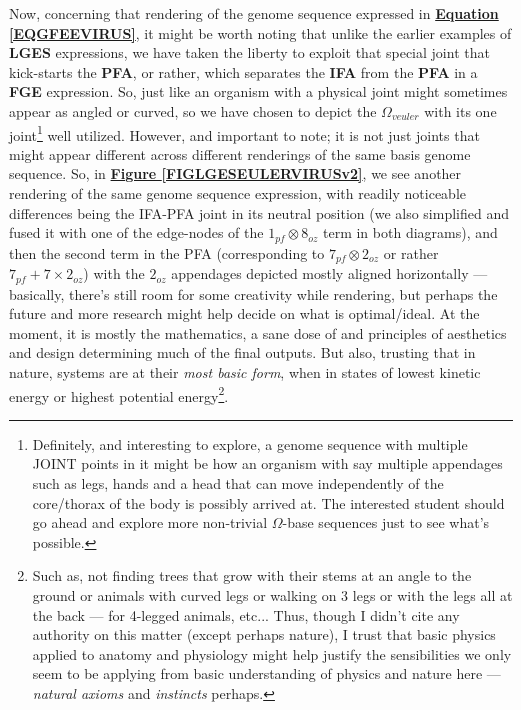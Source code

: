 \documentclass[a4paper, 18pt]{book} %
\begin{document}
Now, concerning that rendering of the genome sequence expressed in \textbf{\hyperref[EQGFEEVIRUS]{Equation \ref{EQGFEEVIRUS}}}, it might be worth noting that unlike the earlier examples of \textbf{LGES} expressions, we have taken the liberty to exploit that special joint that kick-starts the \textbf{PFA}, or rather, which separates the \textbf{IFA} from the \textbf{PFA} in a \textbf{FGE} expression. So, just like an organism with a physical joint might sometimes appear as angled or curved, so we have chosen to depict the $\Omega_{veuler}$ with its one joint\footnote{Definitely, and interesting to explore, a genome sequence with multiple JOINT points in it might be how an organism with say multiple appendages such as legs, hands and a head that can move independently of the core/thorax of the body is possibly arrived at. The interested student should go ahead and explore more non-trivial $\Omega$-base sequences just to see what's possible.} well utilized. However, and important to note; it is not just joints that might appear different across different renderings of the same basis genome sequence. So, in \textbf{\hyperref[FIGLGESEULERVIRUSv2]{Figure \ref{FIGLGESEULERVIRUSv2}}}, we see another rendering of the same genome sequence expression, with readily noticeable differences being the IFA-PFA joint in its neutral position (we also simplified and fused it with one of the edge-nodes of the $1_{pf} \otimes 8_{oz}$ term in both diagrams), and then the second term in the PFA (corresponding to \textbf{$7_{pf} \otimes 2_{oz}$} or rather \textbf{$7_{pf} + 7 \times 2_{oz}$}) with the $2_{oz}$ appendages depicted mostly aligned horizontally --- basically, there's still room for some creativity while rendering, but perhaps the future and more research might help decide on what is optimal/ideal. At the moment, it is mostly the mathematics, a sane dose of and principles of aesthetics and design determining much of the final outputs. But also, trusting that in nature, systems are at their \textit{most basic form}, when in states of lowest kinetic energy or highest potential energy\footnote{Such as, not finding trees that grow with their stems at an angle to the ground or animals with curved legs or walking on 3 legs or with the legs all at the back --- for 4-legged animals, etc... Thus, though I didn't cite any authority on this matter (except perhaps nature), I trust that basic physics applied to anatomy and physiology might help justify the sensibilities we only seem to be applying from basic understanding of physics and nature here --- \textit{natural axioms} and \textit{instincts} perhaps.}.
\end{document}
